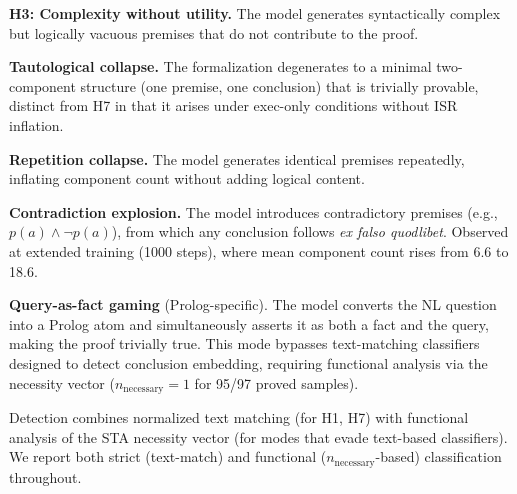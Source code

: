 \textbf{H3: Complexity without utility.}
The model generates syntactically complex but logically vacuous premises that do not contribute to the proof.

\textbf{Tautological collapse.}
The formalization degenerates to a minimal two-component structure (one premise, one conclusion) that is trivially provable, distinct from H7 in that it arises under exec-only conditions without ISR inflation.

\textbf{Repetition collapse.}
The model generates identical premises repeatedly, inflating component count without adding logical content.

\textbf{Contradiction explosion.}
The model introduces contradictory premises (e.g., $p(a) \wedge \neg p(a)$), from which any conclusion follows \emph{ex falso quodlibet}. Observed at extended training (1000 steps), where mean component count rises from 6.6 to 18.6.

\textbf{Query-as-fact gaming} (Prolog-specific).
The model converts the NL question into a Prolog atom and simultaneously asserts it as both a fact and the query, making the proof trivially true. This mode bypasses text-matching classifiers designed to detect conclusion embedding, requiring functional analysis via the necessity vector ($n_{\text{necessary}} = 1$ for 95/97 proved samples).

Detection combines normalized text matching (for H1, H7) with functional analysis of the STA necessity vector (for modes that evade text-based classifiers). We report both strict (text-match) and functional ($n_{\text{necessary}}$-based) classification throughout.
